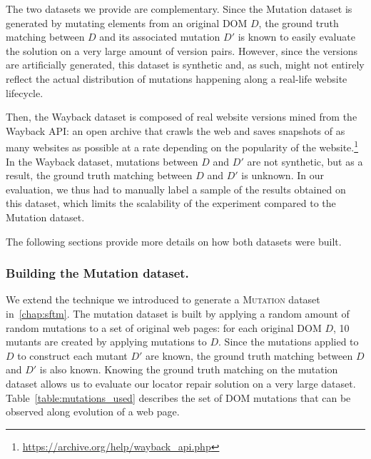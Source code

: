 \begin{table}[!htbp]
    \caption{Description of the \textsc{Mutation} \& \textsc{Wayback} datasets.}
    \label{table:describing_datasets}
    \centering
\end{table}

The two datasets we provide are complementary. 
Since the {\sc Mutation} dataset is generated by mutating elements from an original DOM $D$, the ground truth matching between $D$ and its associated mutation $D'$ is known to easily evaluate the solution on a very large amount of version pairs. 
However, since the versions are artificially generated, this dataset is synthetic and, as such, might not entirely reflect the actual distribution of mutations happening along a real-life website lifecycle.

Then, the {\sc Wayback} dataset is composed of real website versions mined from the Wayback API: an open archive that crawls the web and saves snapshots of as many websites as possible at a rate depending on the popularity of the website.\footnote{\url{https://archive.org/help/wayback_api.php}}
In the {\sc Wayback} dataset, mutations between $D$ and $D'$ are not synthetic, but as a result, the ground truth matching between $D$ and $D'$ is unknown.
In our evaluation, we thus had to manually label a sample of the results obtained on this dataset, which limits the scalability of the experiment compared to the {\sc Mutation} dataset. 

The following sections provide more details on how both datasets were built.

\subsubsection{Building the {\sc Mutation} dataset.}\label{mutationDataset}
We extend the technique we introduced to generate a \textsc{Mutation} dataset in~\ref{chap:sftm}.
The mutation dataset is built by applying a random amount of random mutations to a set of original web pages: for each original DOM $D$, 10 mutants are created by applying mutations to $D$.
Since the mutations applied to $D$ to construct each mutant $D'$ are known, the ground truth matching between $D$ and $D'$ is also known.
Knowing the ground truth matching on the mutation dataset allows us to evaluate our locator repair solution on a very large dataset. 
% 
Table~\ref{table:mutations_used} describes the set of DOM mutations that can be observed along evolution of a web page.

